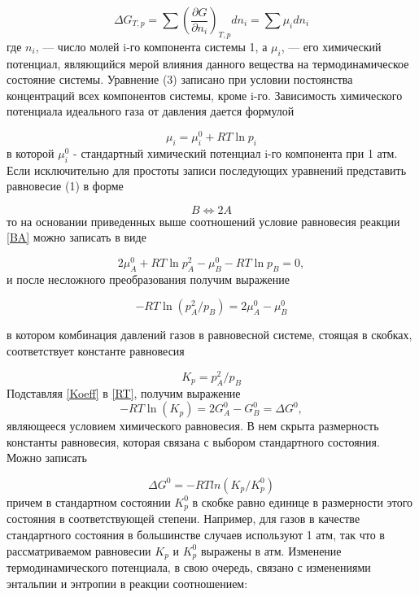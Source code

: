 \documentclass[a4paper,12pt]{article} %
\begin{document}
\begin{equation}
 \Delta G_{T,p}  = \sum {(\frac{\partial G}{\partial n_i})_{T,p} dn_i = \sum {\mu_i dn_i}  }
\end{equation}	
где \(n_i\), — число молей i-го компонента системы 1, а \(\mu_i\), — его химический потенциал, являющийся мерой влияния данного вещества на термодинамическое состояние системы. Уравнение (3) записано при условии постоянства концентраций всех компонентов системы, кроме i-го. Зависимость химического потенциала идеального газа от давления дается формулой

\begin{equation}
 \mu_i = \mu_i^0 + RT \ln{p_i}
\end{equation}
в которой \( \mu_i^0 \) - стандартный химический потенциал i-го компонента при 1 атм.
Если исключительно для простоты записи последующих уравнений представить равновесие (1) в форме

\begin{equation}\label{BA}
 B \Leftrightarrow 2A
\end{equation}
то на основании приведенных выше соотношений условие равновесия реакции \eqref{BA} можно записать в виде

\begin{equation}
 2 \mu_A^0 + RT \ln{p_A^2} - \mu_B^0 - RT \ln{p_B} = 0,
\end{equation}
и после несложного преобразования получим выражение

\begin{equation} \label{RT}
 -RT \ln(p_A^2 / p_B) = 2 \mu_A^0 - \mu_B^0
\end{equation}

в котором комбинация давлений газов в равновесной системе, стоящая в скобках, соответствует константе равновесия

\begin{equation} \label{Koeff}
 K_p = p_A^2 / p_B
\end{equation}
Подставляя \eqref{Koeff} в \eqref{RT}, получим выражение
\begin{equation}
 -RT \ln(K_p) =  2 G_A^0 - G_B^0 = \Delta G^0,
\end{equation}
являющееся условием химического равновесия. В нем скрыта размерность константы равновесия, которая связана с выбором стандартного состояния. Можно записать

\begin{equation}
 \Delta G^0 = -RT ln(K_p / K_p^0)
\end{equation}
причем в стандартном состоянии \(K_p^0\) в скобке равно единице в размерности этого состояния в соответствующей степени. Например, для газов в качестве стандартного состояния в большинстве случаев используют 1 атм, так что в рассматриваемом равновесии \(K_p\) и \(K_p^0\) выражены в атм.
Изменение термодинамического потенциала, в свою очередь, связано с изменениями энтальпии и энтропии в реакции соотношением:
\end{document}
